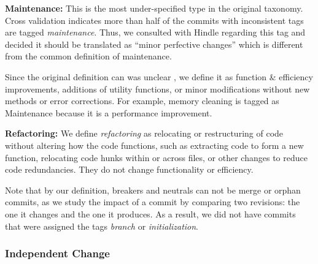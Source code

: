 \textbf{Maintenance:} This is the most under-specified type in the original taxonomy.
Cross validation indicates more than half of the commits with inconsistent tags are tagged \textit{maintenance}. 
Thus, we consulted with Hindle regarding this tag and decided it should be translated as ``minor perfective changes'' which is different from the common definition of maintenance.

Since the original definition can was unclear , we define it as function \& efficiency improvements, additions of utility functions, or minor modifications without new methods or error corrections.
For example, memory cleaning is tagged as Maintenance because it is a performance improvement. 


\textbf{Refactoring:} 
We define \textit{refactoring} as relocating or restructuring of code without altering how the code functions, such as extracting code to form a new function, relocating code hunks within or across files, or other changes to reduce code redundancies.
They do not change functionality or efficiency.

Note that by our definition, breakers and neutrals can not be merge or orphan commits, as we study the impact of a commit by comparing two revisions: the one it changes and the one it produces.
As a result, we did not have commits that were assigned the tags \textit{branch} or \textit{initialization}.


\subsubsection{Independent Change}

